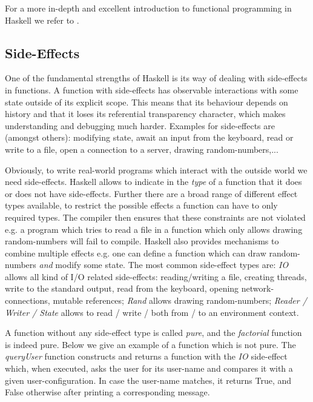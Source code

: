 For a more in-depth and excellent introduction to functional programming in Haskell we refer to \cite{hughes_why_1989,hutton_programming_2016,allen_haskell_2016}.

\subsection{Side-Effects}
One of the fundamental strengths of Haskell is its way of dealing with side-effects in functions. A function with side-effects has observable interactions with some state outside of its explicit scope. This means that its behaviour depends on history and that it loses its referential transparency character, which makes understanding and debugging much harder. Examples for side-effects are (amongst others): modifying state, await an input from the keyboard, read or write to a file, open a connection to a server, drawing random-numbers,...

Obviously, to write real-world programs which interact with the outside world we need side-effects. Haskell allows to indicate in the \textit{type} of a function that it does or does not have side-effects. Further there are a broad range of different effect types available, to restrict the possible effects a function can have to only required types. The compiler then ensures that these constraints are not violated e.g. a program which tries to read a file in a function which only allows drawing random-numbers will fail to compile. Haskell also provides mechanisms to combine multiple effects e.g. one can define a function which can draw random-numbers \textit{and} modify some state. The most common side-effect types are: \textit{IO} allows all kind of I/O related side-effects: reading/writing a file, creating threads, write to the standard output, read from the keyboard, opening network-connections, mutable references; \textit{Rand}  allows drawing random-numbers; \textit{Reader / Writer / State} allows to read / write / both from / to an environment context.

A function without any side-effect type is called \textit{pure}, and the \textit{factorial} function is indeed pure. Below we give an example of a function which is not pure. The \textit{queryUser} function constructs and returns a function with the \textit{IO} side-effect which, when executed, asks the user for its user-name and compares it with a given user-configuration. In case the user-name matches, it returns True, and False otherwise after printing a corresponding message. 

